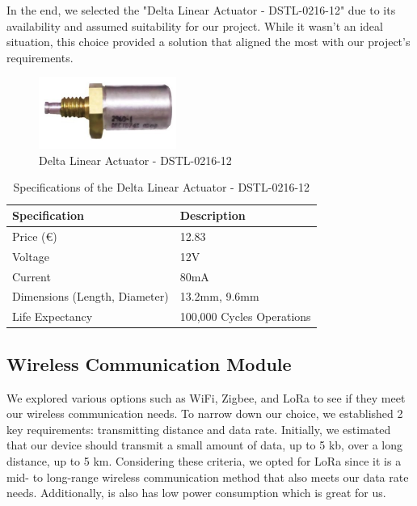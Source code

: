 \documentclass[12pt,a4paper]{article}
\begin{document}
In the end, we selected the "Delta Linear Actuator - DSTL-0216-12" due to its availability and assumed suitability for our project. While it wasn't an ideal situation, this choice provided a solution that aligned the most with our project's requirements. 

\begin{figure}[h]
    \centering
    \includegraphics[width=0.4\textwidth]{images/Actuator.png}
    \caption{Delta Linear Actuator - DSTL-0216-12 \cite{actuator}}
\end{figure}

\begin{table}[h]
    \centering
    \begin{tabular}{|l|l|}
    \hline
    \textbf{Specification} & \textbf{Description} \\ \hline
    Price (€)              & 12.83                \\ \hline
    Voltage                & 12V                  \\ \hline
    Current                & 80mA                 \\ \hline
    Dimensions (Length, Diameter) & 13.2mm, 9.6mm \\ \hline
    Life Expectancy        & 100,000 Cycles Operations \\ \hline
    \end{tabular}
    \caption{Specifications of the Delta Linear Actuator - DSTL-0216-12}
    \label{tab:delta_linear_actuator_dstl_0216_12}
    \end{table}

\subsection{Wireless Communication Module}
We explored various options such as WiFi, Zigbee, and LoRa to see if they meet our wireless communication needs. To narrow down our choice, we established 2 key requirements: transmitting distance and data rate. Initially, we estimated that our device should transmit a small amount of data, up to 5 kb, over a long distance, up to 5 km. Considering these criteria, we opted for LoRa since it is a mid- to long-range wireless communication method that also meets our data rate needs. Additionally, is also has low power consumption which is great for us.
\end{document}
